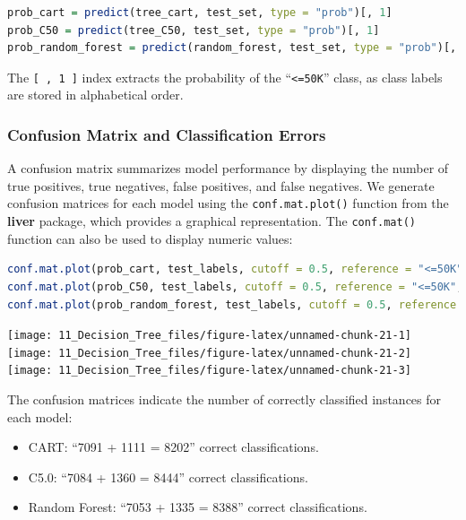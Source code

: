 \documentclass[
  11pt,
]{book}
\newcommand{\passthrough}[1]{#1}
\providecommand{\tightlist}{%
  \setlength{\itemsep}{0pt}\setlength{\parskip}{0pt}}
\theoremstyle{definition}
\theoremstyle{definition}
\theoremstyle{definition}
\theoremstyle{definition}
\theoremstyle{remark}
\begin{document}
\begin{lstlisting}[language=R]
prob_cart = predict(tree_cart, test_set, type = "prob")[, 1]
prob_C50 = predict(tree_C50, test_set, type = "prob")[, 1]
prob_random_forest = predict(random_forest, test_set, type = "prob")[, 1]
\end{lstlisting}

The \passthrough{\lstinline![ , 1 ]!} index extracts the probability of the ``\passthrough{\lstinline!<=50K!}'' class, as class labels are stored in alphabetical order.

\subsubsection*{Confusion Matrix and Classification Errors}\label{confusion-matrix-and-classification-errors}


A confusion matrix summarizes model performance by displaying the number of true positives, true negatives, false positives, and false negatives. We generate confusion matrices for each model using the \passthrough{\lstinline!conf.mat.plot()!} function from the \textbf{liver} package, which provides a graphical representation. The \passthrough{\lstinline!conf.mat()!} function can also be used to display numeric values:

\begin{lstlisting}[language=R]
conf.mat.plot(prob_cart, test_labels, cutoff = 0.5, reference = "<=50K", main = "CART Prediction")
conf.mat.plot(prob_C50, test_labels, cutoff = 0.5, reference = "<=50K", main = "C5.0 Prediction")
conf.mat.plot(prob_random_forest, test_labels, cutoff = 0.5, reference = "<=50K", main = "Random Forest Prediction")
\end{lstlisting}

\texttt{[image: 11\_Decision\_Tree\_files/figure-latex/unnamed-chunk-21-1]} \texttt{[image: 11\_Decision\_Tree\_files/figure-latex/unnamed-chunk-21-2]} \texttt{[image: 11\_Decision\_Tree\_files/figure-latex/unnamed-chunk-21-3]}

The confusion matrices indicate the number of correctly classified instances for each model:

\begin{itemize}
\tightlist
\item
  CART: ``7091 + 1111 = 8202'' correct classifications.\\
\item
  C5.0: ``7084 + 1360 = 8444'' correct classifications.\\
\item
  Random Forest: ``7053 + 1335 = 8388'' correct classifications.
\end{itemize}
\end{document}
